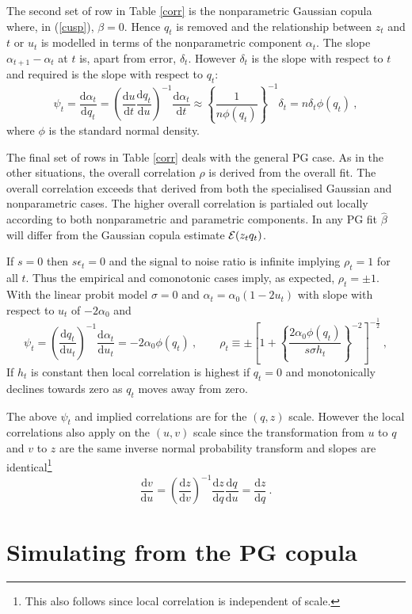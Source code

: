 \documentclass[authoryear]{elsarticle}
\newcommand{\eps}{\epsilon}
\newcommand{\Ex}{{\cal E}}
\newcommand{\de}{\mathrm{d}}
\newcommand{\eref}[1]{(\ref{#1})}
\newcommand{\tref}[1]{Table \ref{#1}}
\newcommand{\cq}{\ , \qquad}
\newcommand{\be}[1]{\begin{equation}\label{#1}}
\newcommand{\ee}{\end{equation}}
\begin{document}
The second set of row in \tref{corr} is the nonparametric Gaussian copula where, in \eref{cusp},  $\beta=0$.  Hence $q_t$ is removed and  the relationship between $z_t$ and $t$ or $u_t$ is  modelled in terms of the  nonparametric component $\alpha_t$.  The   slope $\alpha_{t+1}-\alpha_t$  at  $t$ is, apart from error,
$\delta_t$.   However $\delta_t$ is the slope with respect to $t$ and required is the slope with respect to $q_t$:
\be{normslope}
\psi_t=\frac{\de \alpha_t}{\de q_t} = \left( \frac{\de u}{\de t}\frac{\de q_t}{\de u}\right)^{-1}\frac{\de \alpha_t}{\de t}  \approx
\left\{\frac{1}{n\phi(q_t)}\right\}^{-1}\delta_t  = n\delta_t\phi(q_t)\ ,
\ee
where $\phi$ is the standard normal density.    

The final set of rows in \tref{corr} deals with the general PG case.   As in the other situations, the overall correlation $\rho$ is derived from the overall fit.   The overall correlation exceeds that derived from both the specialised Gaussian and nonparametric cases.   The higher overall correlation is partialed out locally according to both nonparametric and parametric components.   In any PG fit $\hat\beta$ will differ from the Gaussian copula estimate $\Ex(z_tq_t)$.  

If $s=0$ then $s\eps_t=0$  and  the signal to noise ratio is infinite implying $\rho_t=1$ for all $t$.  Thus the empirical and comonotonic cases imply, as expected,  $\rho_t=\pm 1$.   With the linear probit model $\sigma=0$ and $\alpha_t=\alpha_0(1-2u_t)$ with slope with respect to $u_t$ of $-2\alpha_0$ and
\be{normslope2}
\psi_t =  \left( \frac{\de q_t}{\de u_t}\right)^{-1}\frac{\de \alpha_t}{\de u_t}  =
 -2\alpha_0\phi(q_t)\cq  \rho_t\equiv\pm\left[1+\left\{\frac{2\alpha_0\phi(q_t)}{s\sigma h_t}\right\}^{-2}\right]^{-\frac{1}{2}}\ ,
\ee
If $h_t$ is constant then  local correlation is  highest if  $q_t=0$ and monotonically declines towards zero as $q_t$ moves away from zero. 

The above $\psi_t$ and implied correlations are for the $(q,z)$ scale.  However the local correlations also apply on the $(u,v)$ scale since the transformation from $u$ to $q$ and $v$ to $z$ are the same inverse normal probability transform and slopes are identical\footnote{This also follows since local correlation is independent of scale.}
$$
\frac{\de v}{\de u} =\left(\frac{\de z}{\de v}\right)^{-1} \frac{\de z}{\de q} \frac{\de q}{\de u} = \frac{\de z}{\de q}\ .
$$ 
\section{Simulating from the PG copula} 
\end{document}
